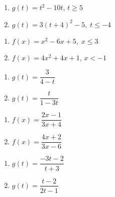 \begin{multicols}{2}
\begin{enumerate}
\setcounter{enumi}{\value{HW}}

\item $g(t) = t^2 - 10t$, $t \geq 5$
\item $g(t) = 3(t + 4)^{2} - 5, \; t \leq -4$

\setcounter{HW}{\value{enumi}}
\end{enumerate}
\end{multicols}


\begin{multicols}{2}
\begin{enumerate}
\setcounter{enumi}{\value{HW}}

\item $f(x) = x^2-6x+5, \; x \leq 3$
\item $f(x) = 4x^2 + 4x + 1$, $x < -1$

\setcounter{HW}{\value{enumi}}
\end{enumerate}
\end{multicols}


\begin{multicols}{2}
\begin{enumerate}
\setcounter{enumi}{\value{HW}}

\item $g(t) = \dfrac{3}{4-t}$
\item $g(t) = \dfrac{t}{1-3t}$

\setcounter{HW}{\value{enumi}}
\end{enumerate}
\end{multicols}


\begin{multicols}{2}
\begin{enumerate}
\setcounter{enumi}{\value{HW}}

\item $f(x) = \dfrac{2x-1}{3x+4}$
\item $f(x) = \dfrac{4x + 2}{3x - 6}$

\setcounter{HW}{\value{enumi}}
\end{enumerate}
\end{multicols}


\begin{multicols}{2}
\begin{enumerate}
\setcounter{enumi}{\value{HW}}

\item $g(t) = \dfrac{-3t - 2}{t + 3}$ 

\item $g(t) = \dfrac{t-2}{2t-1}$  \label{inversehwlast}

\setcounter{HW}{\value{enumi}}
\end{enumerate}
\end{multicols}

